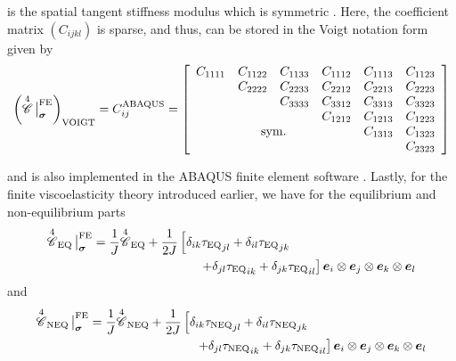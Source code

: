 is the spatial tangent stiffness modulus which is symmetric \cite{Reese1998Sep}. Here, the coefficient matrix \(({C}_{ijkl})\) is sparse, and thus, can be stored in the Voigt notation form given by 
\begin{equation}
    \left({\Cmattot}{\,\big|}^{\text{FE}}_{\bm{\sigma}}\right)_{\text{VOIGT}} = 
    C_{ij}^{\text{ABAQUS}} = \left[\begin{array}{cccccc}
        C_{1111} & C_{1122} & C_{1133} & C_{1112} & C_{1113} & C_{1123} \\
        { } & C_{2222} & C_{2233} & C_{2212} & C_{2213} & C_{2223} \\
         &  & C_{3333} & C_{3312} & C_{3313} & C_{3323} \\
         &  &  & C_{1212} & C_{1213} & C_{1223} \\
         \multicolumn{4}{c}{\text{sym.}} & C_{1313} & C_{1323} \\
         &  &  & { } & { } & C_{2323} 
    \end{array} \right]
    \label{eq:abaqus_tangent_stiffness_modulus}
\end{equation} 

and is also implemented in the ABAQUS finite element software \cite{Abaqus614}. Lastly, for the finite viscoelasticity theory introduced earlier, we have for the equilibrium and non-equilibrium parts
\begin{align}
    \nonumber {\Cmateq}{\,\big|}^{\text{FE}}_{\bm{\sigma}} 
    &= \frac{1}{J}{\Cmateq}
   + \frac{1}{2J} \left[ \delta_{ik} {\tau_{\text{EQ}}}_{jl} + \delta_{il} {\tau_{\text{EQ}}}_{jk} \right. \\
    &\hspace{3cm} \left. + \delta_{jl} {\tau_{\text{EQ}}}_{ik} + \delta_{jk} {\tau_{\text{EQ}}}_{il} \right]  \evec{i} \otimes \evec{j} \otimes \evec{k} \otimes \evec{l}
   \label{eq:jaumann_spatial_tangent_stiffness_eq}
\end{align}
and 
\begin{align}
    \nonumber {\Cmatneq}{\,\big|}^{\text{FE}}_{\bm{\sigma}}
    &= \frac{1}{J}{\Cmatneq}
   + \frac{1}{2J} \left[ \delta_{ik} {\tau_{\text{NEQ}}}_{jl} + \delta_{il} {\tau_{\text{NEQ}}}_{jk} \right. \\
    &\hspace{3cm} \left. + \delta_{jl} {\tau_{\text{NEQ}}}_{ik} + \delta_{jk} {\tau_{\text{NEQ}}}_{il} \right]  \evec{i} \otimes \evec{j} \otimes \evec{k} \otimes \evec{l}
    \label{eq:jaumann_spatial_tangent_stiffness_neq}
 \end{align}

